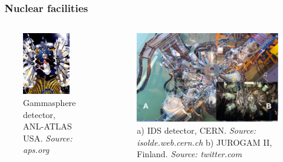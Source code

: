 \documentclass{beamer}
\begin{document}
\begin{frame}
	\frametitle{\faSearch\ Nuclear facilities}
	\vspace{-0.3cm}
	\begin{columns}
		\begin{figure}
		\centering
		\includegraphics[width=0.88\textwidth]{figures/gsfig.jpg}
		\caption{Gammasphere detector, ANL-ATLAS USA. \textit{Source: aps.org}}
	\end{figure}
	\begin{figure}
		\centering
		\includegraphics[width=0.99\textwidth]{figures/isolde_cern_2.png}
		\caption{a) IDS detector, CERN. \textit{Source: isolde.web.cern.ch} b) JUROGAM II, Finland. \textit{Source: twitter.com}}
		\end{figure}
	\end{columns}
\end{frame}
\end{document}
